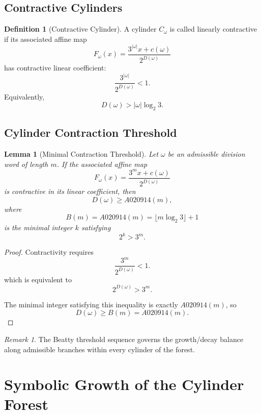 \documentclass[12pt, oneside]{article}
\numberwithin{equation}{section}
\theoremstyle{definition}
\newtheorem{definition}{Definition}[section]
\theoremstyle{plain}
\newtheorem{lemma}[theorem]{Lemma}
\theoremstyle{remark}
\newtheorem*{remark}{Remark}
\begin{document}
\subsection{Contractive Cylinders}

\begin{definition}[Contractive Cylinder]
A cylinder \(C_\omega\) is called linearly contractive if its
associated affine map
\[
F_\omega(x) = \frac{3^{|\omega|}x+c(\omega)}{2^{D(\omega)}}
\]
has contractive linear coefficient:
\[
\frac{3^{|\omega|}}{2^{D(\omega)}}<1.
\]
Equivalently,
\[
D(\omega)>|\omega|\log_2 3.
\]
\end{definition}

\subsection{Cylinder Contraction Threshold}

\begin{lemma}[Minimal Contraction Threshold]
\label{lem:minimal-contraction-threshold}
Let $\omega$ be an admissible division word of length $m$. If the
associated affine map
\[
F_\omega(x) = \frac{3^m x+c(\omega)}{2^{D(\omega)}}
\]
is contractive in its linear coefficient, then
\[
D(\omega)\ge A020914(m),
\]
where
\[
B(m) = A020914(m)=\lfloor m\log_2 3\rfloor + 1
\]
is the minimal integer \(k\) satisfying
\[
2^k>3^m.
\]
\end{lemma}

\begin{proof}
Contractivity requires
\[
\frac{3^m}{2^{D(\omega)}}<1.
\]
which is equivalent to
\[
2^{D(\omega)}>3^m.
\]

The minimal integer satisfying this inequality is exactly
\(A020914(m)\), so
\[
D(\omega) \ge B(m) = A020914(m).
\]
\end{proof}

\begin{remark}
The Beatty threshold sequence  governs the growth/decay balance along
admissible branches within every cylinder of the forest.
\end{remark}


\section{Symbolic Growth of the Cylinder Forest}
\label{sec:symbolic-growth}
\end{document}
